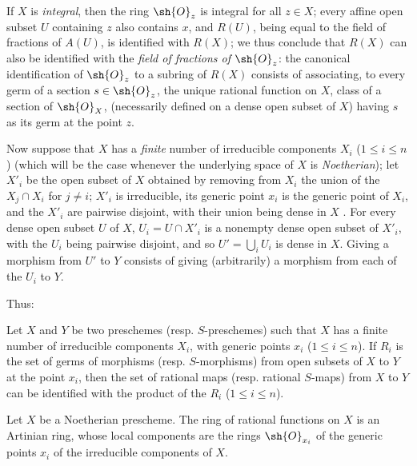 If $X$ is \emph{integral}, then the ring $\sh{O}_z$ is integral for all $z\in X$; every affine open subset $U$ containing $z$ also contains $x$, and $R(U)$, being equal to the field of fractions of $A(U)$, is identified with $R(X)$; we thus conclude that $R(X)$ can also be identified with the \emph{field of fractions of $\sh{O}_z$}: the canonical identification of $\sh{O}_z$ to a subring of $R(X)$ consists of associating, to every germ of a section $s\in\sh{O}_z$, the unique rational function on $X$, class of a section of $\sh{O}_X$, (necessarily defined on a dense open subset of $X$) having $s$ as its germ at the point $z$.

\begin{env}[7.1.6]
\label{I.7.1.6}
Now suppose that $X$ has a \emph{finite} number of irreducible components $X_i$ ($1\leq i\leq n$) (which will be the case whenever the underlying space of $X$ is \emph{Noetherian}); let $X'_i$ be the open subset of $X$ obtained by removing from $X_i$ the union of the $X_j\cap X_i$ for $j\neq i$; $X'_i$ is irreducible, its generic point $x_i$ is the generic point of $X_i$, and the $X'_i$ are pairwise disjoint, with their union being dense in $X$ .
For every dense open subset $U$ of $X$, $U_i=U\cap X'_i$ is a nonempty dense open subset of $X'_i$, with the $U_i$ being pairwise disjoint, and so $U'=\bigcup_i U_i$ is dense in $X$.
Giving a morphism from $U'$ to $Y$ consists of giving (arbitrarily) a morphism from each of the $U_i$ to $Y$.
\end{env}

Thus:
\begin{proposition}[7.1.7]
\label{I.7.1.7}
Let $X$ and $Y$ be two preschemes (resp. $S$-preschemes) such that $X$ has a finite number of irreducible components $X_i$, with generic points $x_i$ ($1\leq i\leq n$).
If $R_i$ is the set of germs of morphisms (resp. $S$-morphisms) from open subsets of $X$ to $Y$ at the point $x_i$, then the set of rational maps (resp. rational $S$-maps) from $X$ to $Y$ can be identified with the product of the $R_i$ ($1\leq i\leq n$).
\end{proposition}

\begin{corollary}[7.1.8]
\label{I.7.1.8}
Let $X$ be a Noetherian prescheme.
The ring of rational functions on $X$ is an Artinian ring, whose local components are the rings $\sh{O}_{x_i}$ of the generic points $x_i$ of the irreducible components of $X$.
\end{corollary}


